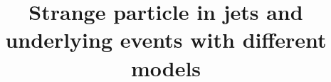 \documentclass[ALICE,manyauthors]{StrinJet}
\begin{document}
\title{Strange particle in jets and underlying events with different models}

\setcounter{page}{1}





\newenvironment{acknowledgement}{\relax}{\relax}
%





\newpage
\appendix
 
\end{document}
